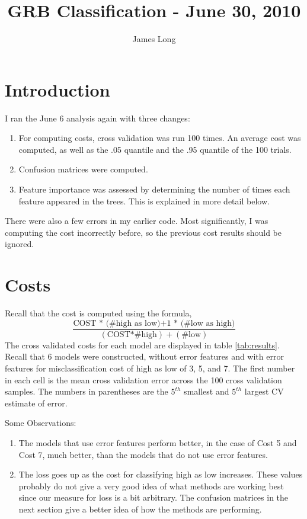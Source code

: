 \documentclass[10pt]{article}
\title{GRB Classification - June 30, 2010}
\date{}
\author{James Long}
\begin{document}
\maketitle
\section{Introduction}


I ran the June 6 analysis again with three changes:
\begin{enumerate}
\item For computing costs, cross validation was run 100 times. An average cost was computed, as well as the .05 quantile and the .95 quantile of the 100 trials.
\item Confusion matrices were computed.
\item Feature importance was assessed by determining the number of times each feature appeared in the trees. This is explained in more detail below.
\end{enumerate}

There were also a few errors in my earlier code. Most significantly, I was computing the cost incorrectly before, so the previous cost results should be ignored.

\section{Costs}
Recall that the cost is computed using the formula,
\begin{equation}
\frac{\text{COST * (\# high as low)} + \text{1 * (\# low as high)}}{(\text{COST*\# high}) + (\text{\# low})} 
\end{equation}
The cross validated costs for each model are displayed in table \ref{tab:results}. Recall that 6 models were constructed, without error features and with error features for misclassification cost of high as low of 3, 5, and 7. The first number in each cell is the mean cross validation error across the 100 cross validation samples. The numbers in parentheses are the $5^{th}$ smallest and $5^{th}$ largest CV estimate of error.

Some Observations:
\begin{enumerate}
\item The models that use error features perform better, in the case of Cost 5 and Cost 7, much better, than the models that do not use error features.
\item The loss goes up as the cost for classifying high as low increases. These values probably do not give a very good idea of what methods are working best since our measure for loss is a bit arbitrary. The confusion matrices in the next section give a better idea of how the methods are performing.
\end{enumerate}
\end{document}
